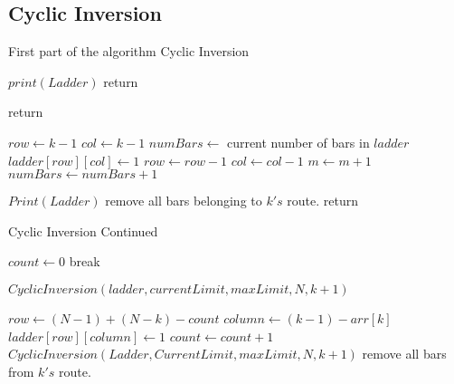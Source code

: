 \subsection{Cyclic Inversion}
\begin{algorithm}
  \caption{First part of the algorithm Cyclic Inversion}
  \begin{algorithmic}[1]


      
        \State $print(Ladder)$
        \State return
      \EndIf

        \State return
      \EndIf


      \State $row \gets k-1$
      \State $col \gets k-1$
      \State $numBars \gets$ current number of bars in $ladder$
        \State $ladder[row][col] \gets 1$
        \State $row \gets row-1$
        \State $col \gets col-1$
        \State $m \gets m+1$
        \State $numBars \gets numBars+1$
      \EndWhile

        \State $Print(Ladder)$
      \EndIf
      \State remove all bars belonging to $k's$ route.
      \State return
    \EndIf


  \end{algorithmic}
\end{algorithm}

\begin{algorithm}
  \caption{Cyclic Inversion Continued}
    \begin{algorithmic}[1]

      \State $count \gets 0$
            \State break
        \EndIf

          \State $CyclicInversion(ladder, currentLimit, maxLimit, N, k+1)$
      
       
        
        \Else
          \State $row \gets (N-1) + (N-k) - count$
          \State $column \gets (k-1)-arr[k]$
          \State $ladder[row][column] \gets 1$
          \State $count \gets count + 1$
          \State $CyclicInversion(Ladder, CurrentLimit, maxLimit, N, k+1)$
        \EndIf
      \EndFor
      \State remove all bars from $k's$ route.

    \EndIf
    \EndFunction
  \end{algorithmic}
\end{algorithm}


